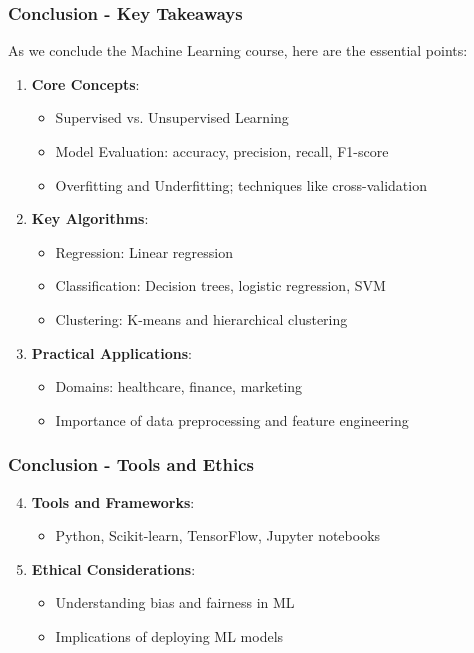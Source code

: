 \documentclass[aspectratio=169]{beamer}
\begin{document}
\begin{frame}[fragile]
    \frametitle{Conclusion - Key Takeaways}
    
    As we conclude the Machine Learning course, here are the essential points:
    
    \begin{enumerate}
        \item \textbf{Core Concepts}:
        \begin{itemize}
            \item Supervised vs. Unsupervised Learning
            \item Model Evaluation: accuracy, precision, recall, F1-score
            \item Overfitting and Underfitting; techniques like cross-validation
        \end{itemize}
        
        \item \textbf{Key Algorithms}:
        \begin{itemize}
            \item Regression: Linear regression
            \item Classification: Decision trees, logistic regression, SVM
            \item Clustering: K-means and hierarchical clustering
        \end{itemize}
        
        \item \textbf{Practical Applications}:
        \begin{itemize}
            \item Domains: healthcare, finance, marketing
            \item Importance of data preprocessing and feature engineering
        \end{itemize}
    \end{enumerate}
\end{frame}

\begin{frame}[fragile]
    \frametitle{Conclusion - Tools and Ethics}

    \begin{enumerate}
        \setcounter{enumi}{3}
        \item \textbf{Tools and Frameworks}:
        \begin{itemize}
            \item Python, Scikit-learn, TensorFlow, Jupyter notebooks
        \end{itemize}
        
        \item \textbf{Ethical Considerations}:
        \begin{itemize}
            \item Understanding bias and fairness in ML
            \item Implications of deploying ML models
        \end{itemize}
    \end{enumerate}
\end{frame}
\end{document}
